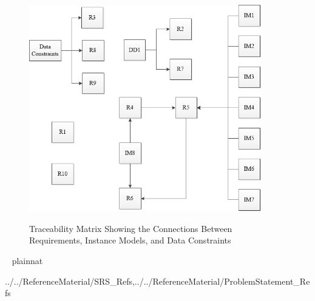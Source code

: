 \documentclass[12pt]{article}
\begin{document}
 \begin{figure}[H]
 	\begin{center}
 		{
 			\includegraphics[width=0.9\textwidth]{figures/RTrace.png}
 		}
 		\caption{\label{Fig_RTrace} Traceability Matrix Showing the Connections 
 		Between Requirements, Instance Models, and Data Constraints}
 	\end{center}
 \end{figure}

~\newpage
 {plainnat}
 
{../../ReferenceMaterial/SRS_Refs,../../ReferenceMaterial/ProblemStatement_Refs}

%
%
%
%
\end{document}
